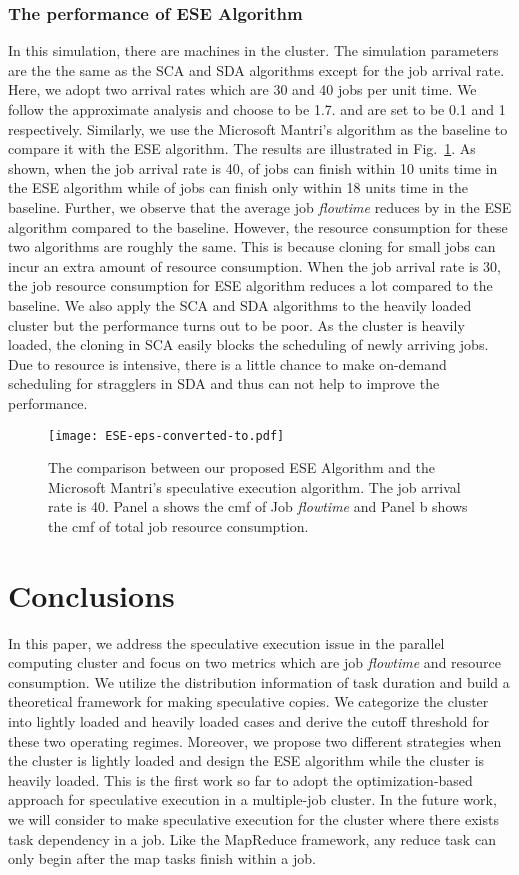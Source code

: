 \documentclass[10pt,conference]{IEEEtran}
\begin{document}
\subsubsection{The performance of ESE Algorithm}
In this simulation, there are  machines in the cluster. The simulation parameters are the the same as the SCA and SDA algorithms except for the job arrival rate. Here, we adopt two arrival rates which are 30 and 40 jobs per unit time. We follow the approximate analysis and choose  to be 1.7.  and  are set to be 0.1 and 1 respectively. Similarly, we use the Microsoft Mantri's algorithm as the baseline to compare it with the ESE algorithm. The results are illustrated in Fig.~\ref{ESE_40}. As shown, when the job arrival rate is 40,  of jobs can finish within 10 units time in the ESE algorithm while  of jobs can finish only within 18 units time in the baseline. Further, we observe that the average job \textit{flowtime} reduces by  in the ESE algorithm compared to the baseline. However, the resource consumption for these two algorithms are roughly the same. This is because cloning for small jobs can incur an extra amount of resource consumption. When the job arrival rate  is 30, the job resource consumption for ESE algorithm reduces a lot compared to the baseline. We also apply the SCA and SDA algorithms to the heavily loaded cluster but the performance turns out to be poor. As the cluster is heavily loaded, the cloning in SCA easily blocks the scheduling of newly arriving jobs. Due to resource is intensive, there is a little chance to make on-demand scheduling for stragglers in SDA and thus can not help to improve the performance.

\begin{figure}
\centering
\texttt{[image: ESE-eps-converted-to.pdf]}
\caption{The comparison between our proposed ESE Algorithm and the Microsoft Mantri's speculative execution algorithm.  The job arrival rate is 40. Panel a shows the cmf of Job \textit{flowtime} and Panel b shows the cmf of total job resource consumption.}
\label{ESE_40}
\vspace{-0.3 cm}
\end{figure}
\section{Conclusions}
\label{conclusions}
In this paper, we address the speculative execution issue in the parallel computing cluster and focus on two metrics which are job \textit{flowtime} and resource consumption. We utilize the distribution information of task duration and build a theoretical framework for making speculative copies. We categorize the cluster into lightly loaded and heavily loaded cases and derive the cutoff threshold for these two operating regimes. Moreover, we propose two different strategies when the cluster is lightly loaded and design the ESE algorithm while the cluster is heavily loaded. This is the first work so far to adopt the optimization-based approach for speculative execution in a multiple-job cluster. In the future work, we will consider to make speculative execution for the cluster where there exists task dependency in a job. Like the MapReduce framework, any reduce task can only begin after the map tasks finish within a job.



\end{document}
